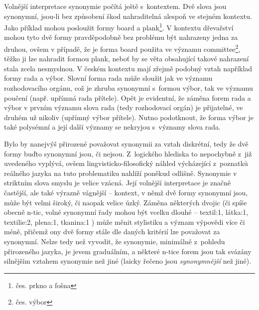 \documentclass[a4paper, 11pt, oneside, showtrims]{book}
\newcommand\ex{\textsf}
\begin{document}
					Volnější interpretace synonymie počítá ještě s~kontextem. Dvě slova jsou synonymní, jsou-li bez způsobení škod nahraditelná alespoň ve stejném kontextu. Jako příklad mohou posloužit formy \ex{board} a \ex{plank}\footnote{čes. \ex{prkno} a \ex{fošna}}. V kontextu dřevařství mohou tyto dvě formy pravděpodobně bez problému být nahrazeny jedna za druhou, ovšem v případě, že je forma \ex{board} použita ve významu \ex{committee}\footnote{čes. \ex{výbor}}, těžko ji lze nahradit formou \ex{plank}, neboť by se věta obsahující takové nahrazení stala zcela nesmyslnou. \parencite{miller1990introduction} V českém kontextu mají zřejmě podobný vztah například formy \ex{rada} a \ex{výbor}. Slovní forma \ex{rada} může sloužit jak ve významu rozhodovacího orgánu, což je zhruba synonymní s~formou \ex{výbor}, tak ve významu poučení (např. \ex{upřímná rada přítele}). Opět je evidentní, že záměna forem \ex{rada} a \ex{výbor} v prvním významu slova \ex{rada} (tedy rozhodovací orgán) je přijatelné, ve druhém už nikoliv (\ex{upřímný výbor přítele}). Nutno podotknout, že forma \ex{výbor} je také polysémní a její další významy se nekryjou s~významy slova \ex{rada}. \parencite{Havranek1989}

					Bylo by nanejvýš přirozené považovat synonymii za vztah diskrétní, tedy že dvě formy buďto synonymní jsou, či nejsou. Z~logického hlediska to nepochybně z~již uvedeného vyplývá, ovšem lingvisticko-filosofický náhled výcházející z~poznatků reálného jazyka na tuto problematiku nahlíží poněkud odlišně. Synonymie v striktním slova smyslu je velice vzácná. Její volnější interpretace je značně častější, ale také výrazně vágnější -- kontext, v němž dvě formy synonymní jsou, může být velmi široký, či naopak velice úzký. Záměna některých dvojic (či spíše obecně n-tic, volné synonymní řady mohou být vcelku dlouhé -- \ex{textil:1, látka:1, textilie:2, plena:1, tkanina:1} \parencite{pala2004building}) může měnit stylistiku a význam výpovědi více či méně, přičemž ony dvě formy stále dle daných kritérií lze považovat za synonymní. Nelze tedy než vyvodit, že synonymie, minimálně z~pohledu přirozeného jazyka, je jevem graduálním, a některé n-tice forem jsou tak svázány silnějším vztahem synonymie než jiné (laicky řečeno jsou \textit{synonymnější} než jiné). \parencite{miller1990introduction}
\end{document}

